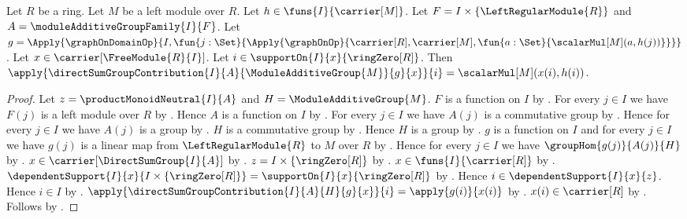 \begin{proposition}\label{free_module_lift_contribution_apply}
    Let $R$ be a ring.
    Let $M$ be a left module over $R$.
    Let $h\in\funs{I}{\carrier[M]}$.
    Let $F=I\times\{\LeftRegularModule{R}\}$ and
        $A=\moduleAdditiveGroupFamily{I}{F}$.
    Let
        $g=\Apply{\graphOnDomainOp}{
            I,\fun{j:\Set}{
                \Apply{\graphOnOp}{
                    \carrier[R],\carrier[M],
                    \fun{a:\Set}{\scalarMul[M](a,h(j))}}}}$.
    Let $x\in\carrier[\FreeModule{R}{I}]$.
    Let $i\in\supportOn{I}{x}{\ringZero[R]}$.
    Then
        $\apply{\directSumGroupContribution{I}{A}{
            \ModuleAdditiveGroup{M}}{g}{x}}{i}
            =\scalarMul[M](x(i),h(i))$.
\end{proposition}
\begin{proof}
    Let $z=\productMonoidNeutral{I}{A}$ and
        $H=\ModuleAdditiveGroup{M}$.
    $F$ is a function on $I$ by
        .
    For every $j\in I$ we have $F(j)$ is a left module over $R$ by
        .
    Hence $A$ is a function on $I$ by
        .
    For every $j\in I$ we have $A(j)$ is a commutative group by
        .
    Hence for every $j\in I$ we have $A(j)$ is a group by
        .
    $H$ is a commutative group by
        .
    Hence $H$ is a group by .
    $g$ is a function on $I$ and for every $j\in I$ we have
        $g(j)$ is a linear map from $\LeftRegularModule{R}$ to $M$ over $R$ by
        .
    Hence for every $j\in I$ we have $\groupHom{g(j)}{A(j)}{H}$ by
        .
    $x\in\carrier[\DirectSumGroup{I}{A}]$ by
        .
    $z=I\times\{\ringZero[R]\}$ by
        .
    $x\in\funs{I}{\carrier[R]}$ by
        .
    $\dependentSupport{I}{x}{I\times\{\ringZero[R]\}}
        =\supportOn{I}{x}{\ringZero[R]}$ by
        .
    Hence $i\in\dependentSupport{I}{x}{z}$.
    Hence $i\in I$ by .
    $\apply{\directSumGroupContribution{I}{A}{H}{g}{x}}{i}
        =\apply{g(i)}{x(i)}$ by
        .
    $x(i)\in\carrier[R]$ by .
    Follows by .
\end{proof}

